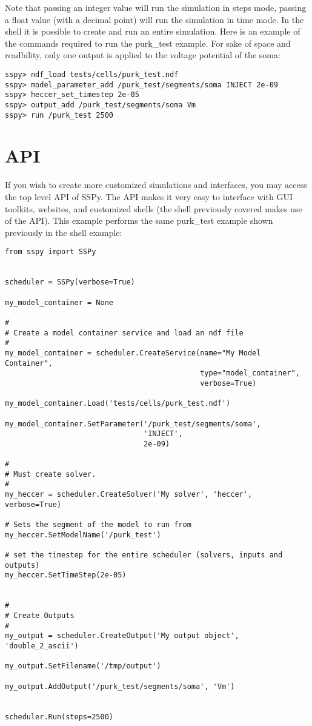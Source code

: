 \documentclass[12pt]{article}
\begin{document}
Note that passing an integer value will run the simulation in steps mode, passing a float value (with a decimal point) will run the simulation in time mode. In the shell it is possible to create and run an entire simulation. Here is an example of the commands required to run the purk\_test example. For sake of space and readbility, only one output is applied to the voltage potential of the soma:

\begin{verbatim}
sspy> ndf_load tests/cells/purk_test.ndf
sspy> model_parameter_add /purk_test/segments/soma INJECT 2e-09
sspy> heccer_set_timestep 2e-05
sspy> output_add /purk_test/segments/soma Vm
sspy> run /purk_test 2500
\end{verbatim}


\section*{API}

	If you wish to create more customized simulations and interfaces, you may access the top level API of SSPy. The API makes it very easy to interface with GUI toolkits, websites, and customized shells (the shell previously covered makes use of the API). This example performs the same purk\_test example shown previously in the shell example:
	
\begin{verbatim}
from sspy import SSPy 


scheduler = SSPy(verbose=True)

my_model_container = None

#
# Create a model container service and load an ndf file
#    
my_model_container = scheduler.CreateService(name="My Model Container",
                                             type="model_container",
                                             verbose=True)

my_model_container.Load('tests/cells/purk_test.ndf')

my_model_container.SetParameter('/purk_test/segments/soma',
                                'INJECT',
                                2e-09)

#
# Must create solver.
#
my_heccer = scheduler.CreateSolver('My solver', 'heccer', verbose=True)

# Sets the segment of the model to run from
my_heccer.SetModelName('/purk_test')

# set the timestep for the entire scheduler (solvers, inputs and outputs)
my_heccer.SetTimeStep(2e-05)


#
# Create Outputs
#
my_output = scheduler.CreateOutput('My output object', 'double_2_ascii')

my_output.SetFilename('/tmp/output')

my_output.AddOutput('/purk_test/segments/soma', 'Vm')


scheduler.Run(steps=2500)

\end{verbatim}
\end{document}
